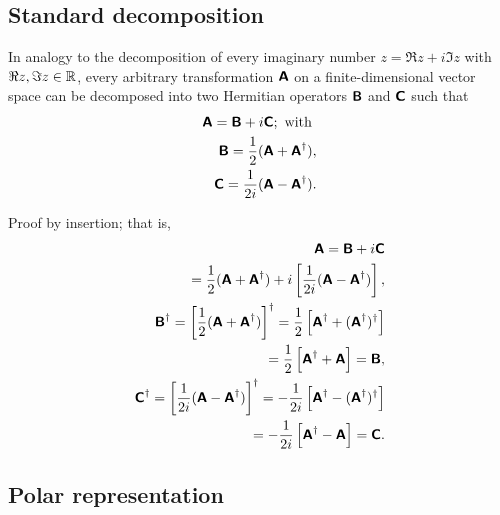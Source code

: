 \subsection{Standard decomposition}

In analogy to the decomposition of every imaginary number $z= \Re z +i \Im z$ with $\Re z,\Im z\in {\Bbb R}$,
every arbitrary transformation $\textsf{\textbf{A}}$ on a finite-dimensional vector space can be decomposed into two Hermitian operators
$\textsf{\textbf{B}}$
and
$\textsf{\textbf{C}}$
such that
\begin{equation}
\begin{split}
\textsf{\textbf{A}}=\textsf{\textbf{B}} + i \textsf{\textbf{C}}; \textrm{ with }  \\
\textsf{\textbf{B}}=\frac{1}{2}(\textsf{\textbf{A}} +   \textsf{\textbf{A}}^\dagger ), \\
\textsf{\textbf{C}}=\frac{1}{2i}(\textsf{\textbf{A}} -   \textsf{\textbf{A}}^\dagger ).
\end{split}
\end{equation}

{\color{OliveGreen}
\bproof
Proof by insertion; that is,
\begin{equation}
\begin{split}
\textsf{\textbf{A}}=\textsf{\textbf{B}} + i \textsf{\textbf{C}}\\
\quad =
\frac{1}{2}(\textsf{\textbf{A}} +   \textsf{\textbf{A}}^\dagger ) + i \left[\frac{1}{2i}(\textsf{\textbf{A}} -   \textsf{\textbf{A}}^\dagger )\right],
\\
\textsf{\textbf{B}}^\dagger=   \left[\frac{1}{2}(\textsf{\textbf{A}} +   \textsf{\textbf{A}}^\dagger )\right]^\dagger
  =    \frac{1}{2}\left[\textsf{\textbf{A}}^\dagger +  ( \textsf{\textbf{A}}^\dagger )^\dagger \right]\\
 =    \frac{1}{2}\left[\textsf{\textbf{A}}^\dagger +    \textsf{\textbf{A}} \right]
 =  \textsf{\textbf{B}} , \\
\textsf{\textbf{C}}^\dagger=   \left[\frac{1}{2i}(\textsf{\textbf{A}} -   \textsf{\textbf{A}}^\dagger )\right]^\dagger
 =   -\frac{1}{2i}\left[\textsf{\textbf{A}}^\dagger -  ( \textsf{\textbf{A}}^\dagger )^\dagger \right]\\
  =   -\frac{1}{2i}\left[\textsf{\textbf{A}}^\dagger -    \textsf{\textbf{A}}\right]
 =  \textsf{\textbf{C}} .
\end{split}
\end{equation}
\eproof
}


\subsection{Polar representation}

